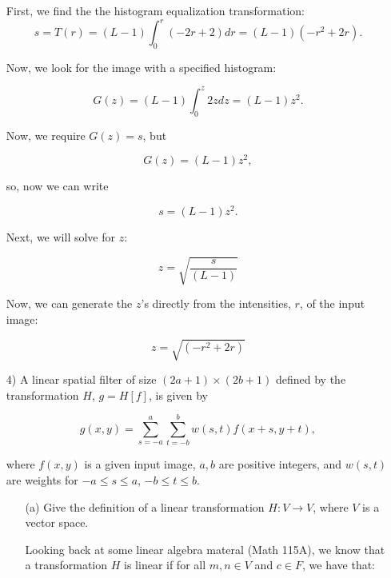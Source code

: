 \documentclass{article}
\begin{document}
\begin{enumerate}
First, we find the the histogram equalization transformation:
\begin{equation} 
s=T(r)=(L-1) \int_{0}^{r} (-2r+2)dr = (L-1)(-r^2 + 2r) .
\end{equation}

Now, we look for the image with a specified histogram:

\begin{equation}
G(z) = (L-1) \int_{0}^{z} 2z dz = (L-1)z^2 .
\end{equation}

Now, we require $G(z) = s$, but 

\begin{equation}
G(z) = (L-1) z^2,
\end{equation}

so, now we can write

\begin{equation}
s=(L-1) z^2.
\end{equation}

Next, we will solve for $z$:

\begin{equation}
z=\sqrt{\frac{s}{(L-1)}}
\end{equation}

Now, we can generate the $z$'s directly from the intensities, $r$, of the input image:

\begin{equation}
z= \sqrt{(-r^2 + 2r)}
\end{equation}

\item[4)] A linear spatial filter of size $(2a+1) \times (2b+1)$ defined by the transformation $H$, $g=H[f]$, is given by

\begin{equation}
g(x,y)=\sum_{s=-a}^{a} \sum_{t=-b}^{b} w(s,t)f(x+s, y+t),
\end{equation}

where $f(x, y)$ is a given input image, $a, b$ are positive integers, and $w(s, t)$ are weights for $-a \leq s \leq a$, $-b \leq t \leq b$.

\begin{enumerate}
\item[(a)] Give the definition of a linear transformation $H : V \rightarrow V$, where $V$ is a vector space.

Looking back at some linear algebra materal (Math 115A), we know that a transformation $H$ is linear if for all $m,n \in V$ and $c \in F$,
we have that:


\end{enumerate}
\end{enumerate}
\end{document}
